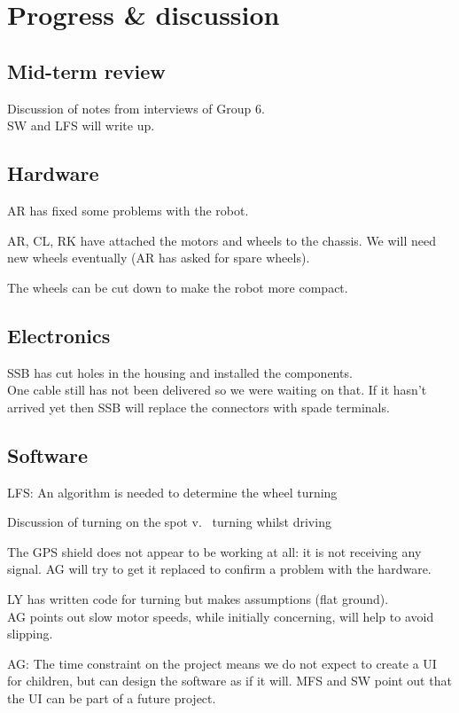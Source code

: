 \documentclass[a4paper,11pt,twoside,class=meetingmins,crop=false]{standalone}
\begin{document}
\section{Progress \& discussion}
\begin{items}
    \subsection{Mid-term review}
        \item Discussion of notes from interviews of Group 6.\\
        SW and LFS will write up.
    \subsection{Hardware}
        \item AR has fixed some problems with the robot.
        \item AR, CL, RK have attached the motors and wheels to the chassis. We will need new wheels eventually (AR has asked for spare wheels).
        \item The wheels can be cut down to make the robot more compact.
    \subsection{Electronics}
        \item SSB has cut holes in the housing and installed the components.\\
        One cable still has not been delivered so we were waiting on that. If it hasn't arrived yet then SSB will replace the connectors with spade terminals.
    \subsection{Software}
        \item LFS: An algorithm is needed to determine the wheel turning
        \item Discussion of turning on the spot v.~ turning whilst driving
        \item The GPS shield does not appear to be working at all: it is not receiving any signal. AG will try to get it replaced to confirm a problem with the hardware.
        \item LY has written code for turning but makes assumptions (\eg flat ground).\\
        AG points out slow motor speeds, while initially concerning, will help to avoid slipping.
        \item AG: The time constraint on the project means we do not expect to create a UI for children, but can design the software as if it will. MFS and SW point out that the UI can be part of a future project.
\end{items}
\end{document}
